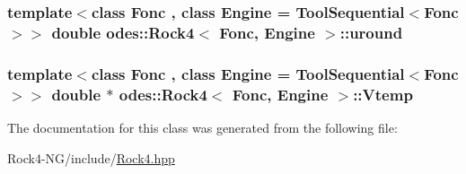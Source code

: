 \hypertarget{classodes_1_1Rock4_a796e21d91cd4a5b19b1054bf7dfd6912}{
\subsubsection[{uround}]{\setlength{\rightskip}{0pt plus 5cm}template$<$class Fonc , class Engine  = Tool\-Sequential$<$\-Fonc$>$$>$ double {\bf odes\-::\-Rock4}$<$ Fonc, Engine $>$\-::uround\hspace{0.3cm}{\ttfamily [private]}}}\label{classodes_1_1Rock4_a796e21d91cd4a5b19b1054bf7dfd6912}
\hypertarget{classodes_1_1Rock4_ab00e963339b09af3e02bc80192f16ff2}{
\subsubsection[{Vtemp}]{\setlength{\rightskip}{0pt plus 5cm}template$<$class Fonc , class Engine  = Tool\-Sequential$<$\-Fonc$>$$>$ double $\ast$ {\bf odes\-::\-Rock4}$<$ Fonc, Engine $>$\-::Vtemp\hspace{0.3cm}{\ttfamily [private]}}}\label{classodes_1_1Rock4_ab00e963339b09af3e02bc80192f16ff2}


The documentation for this class was generated from the following file\-:\begin{DoxyCompactItemize}
\item 
Rock4-\/\-N\-G/include/\hyperlink{Rock4_8hpp}{Rock4.\-hpp}\end{DoxyCompactItemize}
